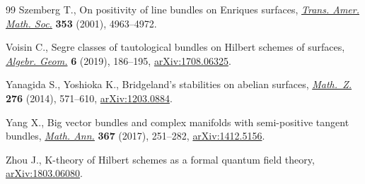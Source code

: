 \documentclass[pdftex]{sigma}
\numberwithin{equation}{section}
\begin{document}
\begin{thebibliography}{99}
Szemberg T., On positivity of line bundles on {E}nriques surfaces,
 \href{https://doi.org/10.1090/S0002-9947-01-02788-X}{\textit{Trans. Amer. Math. Soc.}} \textbf{353} (2001), 4963--4972.

Voisin C., Segre classes of tautological bundles on {H}ilbert schemes of
 surfaces, \href{https://doi.org/10.14231/AG-2019-010}{\textit{Algebr. Geom.}} \textbf{6} (2019), 186--195,
 \href{https://arxiv.org/abs/1708.06325}{arXiv:1708.06325}.

Yanagida S., Yoshioka K., Bridgeland's stabilities on abelian surfaces,
 \href{https://doi.org/10.1007/s00209-013-1214-1}{\textit{Math.~Z.}} \textbf{276} (2014), 571--610, \href{https://arxiv.org/abs/1203.0884}{arXiv:1203.0884}.

Yang X., Big vector bundles and complex manifolds with semi-positive tangent
 bundles, \href{https://doi.org/10.1007/s00208-016-1382-5}{\textit{Math. Ann.}} \textbf{367} (2017), 251--282,
 \href{https://arxiv.org/abs/1412.5156}{arXiv:1412.5156}.

Zhou J., K-theory of Hilbert schemes as a formal quantum field theory,
 \href{https://arxiv.org/abs/1803.06080}{arXiv:1803.06080}.

\end{thebibliography}\LastPageEnding
\end{document}
